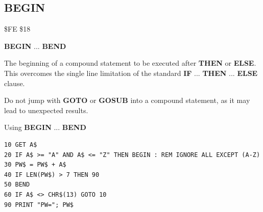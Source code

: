 \subsection{BEGIN}
\begin{description}[leftmargin=2cm,style=nextline]
\item [Token:]   \$FE \$18

\item [Format:]  {\bf BEGIN} ... {\bf BEND}

\item [Usage:]   The beginning of a compound statement to be executed after {\bf THEN} or {\bf ELSE}. This overcomes the single line limitation of the standard {\bf IF} ... {\bf THEN} ... {\bf ELSE} clause.

\item [Remarks:] Do not jump with {\bf GOTO} or {\bf GOSUB} into a compound statement, as it may lead to unexpected results.

\item [Example:] Using {\bf BEGIN} ... {\bf BEND}

\begin{tcolorbox}[colback=black,coltext=white]
\verbatimfont{\codefont}
\begin{verbatim}
10 GET A$
20 IF A$ >= "A" AND A$ <= "Z" THEN BEGIN : REM IGNORE ALL EXCEPT (A-Z)
30 PW$ = PW$ + A$
40 IF LEN(PW$) > 7 THEN 90
50 BEND
60 IF A$ <> CHR$(13) GOTO 10
90 PRINT "PW="; PW$
\end{verbatim}
\end{tcolorbox}
\end{description}


\newpage
